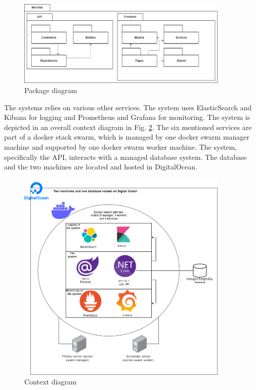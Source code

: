 \documentclass[10pt]{article}
\begin{document}
\begin{figure} [H]
  \centering
  \includegraphics[width=0.9\textwidth]{images/devops-overall_module_view.png}
  \caption{Package diagram}
  \label{fig:package}
\end{figure}

The systems relies on various other services. The system uses ElasticSearch and Kibana for logging and Prometheus and Grafana for monitoring. The system is depicted in an overall context diagram in Fig. \ref{fig:context}. The six mentioned services are part of a docker stack swarm, which is managed by one docker swarm manager machine and supported by one docker swarm worker machine. The system, specifically the API, interacts with a managed database system. The database and the two machines are located and hosted in DigitalOcean.

\begin{figure} [H]
  \centering
  \includegraphics[width=0.9\textwidth]{images/devops-diagram.png}
  \caption{Context diagram}
  \label{fig:context}
\end{figure}
\end{document}
